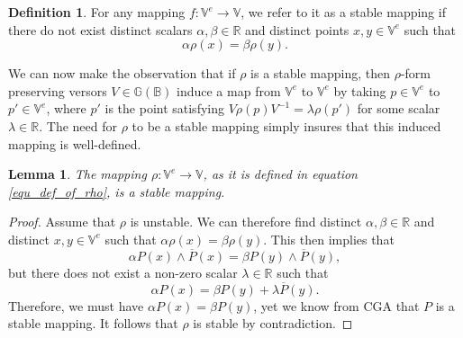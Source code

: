 \documentclass{birkjour}
\newtheorem{lem}[thm]{Lemma}
\theoremstyle{definition}
\newtheorem{defn}[thm]{Definition}
\theoremstyle{remark}
\numberwithin{equation}{section}
\newcommand{\G}{\mathbb{G}}
\newcommand{\V}{\mathbb{V}}
\newcommand{\R}{\mathbb{R}}
\newcommand{\B}{\mathbb{B}}
\begin{document}
\begin{defn}
For any mapping $f:\V^e\to\V$, we refer to it as a stable mapping
if there do not exist distinct scalars $\alpha,\beta\in\R$ and
distinct points $x,y\in\V^e$ such that
\begin{equation}
\alpha\rho(x)=\beta\rho(y).
\end{equation}
\end{defn}

We can now make the observation that if $\rho$ is a stable mapping,
then $\rho$-form preserving versors $V\in\G(\B)$ induce a map from $\V^e$ to $\V^e$ by
taking $p\in\V^e$ to $p'\in\V^e$, where $p'$ is the point satisfying
$V\rho(p)V^{-1}=\lambda\rho(p')$ for some scalar $\lambda\in\R$.
The need for $\rho$ to be a stable mapping simply insures that this
induced mapping is well-defined.

\begin{lem}
The mapping $\rho:\V^e\to\V$, as it is defined in equation \eqref{equ_def_of_rho},
is a stable mapping.
\end{lem}
\begin{proof}
Assume that $\rho$ is unstable.  We can therefore find distinct $\alpha,\beta\in\R$ and distinct $x,y\in\V^e$
such that $\alpha\rho(x)=\beta\rho(y)$.  This then implies that
\begin{equation}
\alpha P(x)\wedge\overline{P}(x) = \beta P(y)\wedge\overline{P}(y),
\end{equation}
but there does not exist a non-zero scalar $\lambda\in\R$ such that
\begin{equation}
\alpha P(x) = \beta P(y) + \lambda\overline{P}(y).
\end{equation}
Therefore, we must have $\alpha P(x)=\beta P(y)$, yet we know
from CGA that $P$ is a stable mapping.  It follows that $\rho$ is stable by contradiction.
\end{proof}
\end{document}
